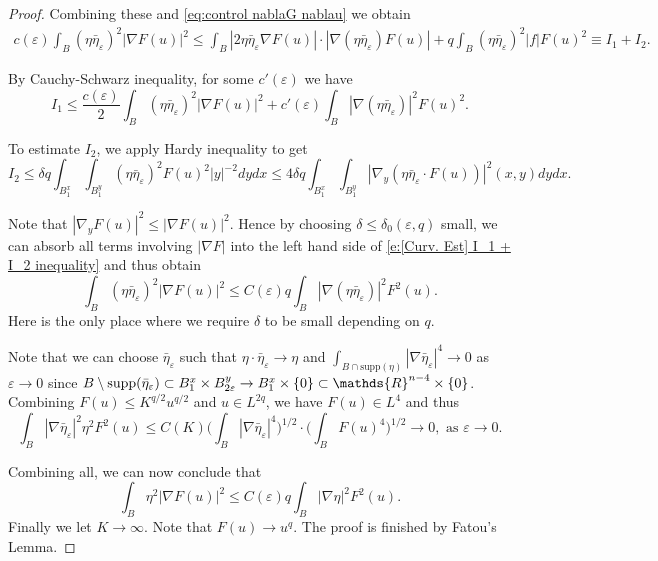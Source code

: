 \documentclass[11pt,reqno]{amsart}
\numberwithin{equation}{section}
\newcommand{\RR}{\mathds{R}}
\newcommand{\supp}{\mathrm{supp }}
\theoremstyle{definition}
\theoremstyle{remark}
\begin{document}
\begin{proof}
Combining these and \eqref{eq:control nablaG nablau} we obtain
\begin{align}\label{e:[Curv. Est] I_1 + I_2 inequality}
    c(\varepsilon) \int_B (\eta \bar{\eta}_{\varepsilon})^2 |\nabla F(u)|^2 \leqslant \int_{B} |2 \eta \bar{\eta}_{\varepsilon} \nabla F(u)| \cdot |\nabla(\eta \bar{\eta}_{\varepsilon}) F(u)|  + q \int_B (\eta \bar{\eta}_{\varepsilon})^2 |f| F(u)^2 \equiv I_1 + I_2.
\end{align}

By Cauchy-Schwarz inequality, for some $c'(\varepsilon)$ we have
\begin{equation}
    I_1 \leqslant \frac{c(\varepsilon)}{2} \int_B (\eta \bar{\eta}_{\varepsilon})^2 |\nabla F(u)|^2 + c'(\varepsilon) \int_B |\nabla (\eta \bar{\eta}_{\varepsilon})|^2 F(u)^2.
\end{equation}

To estimate $I_2$, we apply Hardy inequality to get
\begin{equation}\label{e:[curvatuer bound] I_2}
    I_2 \leqslant  \delta q \int_{B_1^x} \int_{B_1^y} 
    (\eta \bar{\eta}_{\varepsilon})^2 F(u)^2 |y|^{-2} dy dx \leqslant  4\delta q \int_{B_1^x} \int_{B_1^y} |\nabla_y   (\eta \bar{\eta}_{\varepsilon} \cdot F(u))|^2(x,y) dy dx. 
\end{equation}

Note that $|\nabla_y F(u)|^2 \leqslant |\nabla F(u)|^2$. Hence by choosing $\delta \leqslant \delta_0(\varepsilon,q)$ small, we can absorb all terms involving $|\nabla F|$ into the left hand side of \eqref{e:[Curv. Est] I_1 + I_2 inequality} and thus obtain
\begin{equation}
    \int_{B} (\eta \bar{\eta}_{\varepsilon})^2 |\nabla F(u)|^2 \leqslant C(\varepsilon)q \int_B |\nabla (\eta \bar{\eta}_{\varepsilon})|^2 F^2(u).
\end{equation}
Here is the only place where we require $\delta$ to be small depending on $q$. 

Note that we can choose $\bar{\eta}_{\varepsilon}$ such that $\eta \cdot \bar{\eta}_{\varepsilon} \to \eta$ and $\int_{B \cap \supp(\eta)} | \nabla \bar{\eta}_{\varepsilon}|^4 \to 0$ as $\varepsilon \to 0$ since $B\setminus \supp(\Bar{\eta}_{\varepsilon}) \subset B_1^x \times B_{2\varepsilon}^y \to B_1^x \times \{0\} \subset \RR^{n-4} \times \{0\}$. Combining $F(u) \leqslant K^{q/2} u^{q/2}$ and $u \in L^{2q}$, we have $F(u) \in L^4$ and thus
\begin{equation}
    \int_{B} |\nabla \bar{\eta}_{\varepsilon}|^2 \eta^2 F^2(u) \leqslant C(K) \Bigg(\int_{B} |\nabla \bar{\eta}_{\varepsilon}|^4 \Bigg)^{1/2} \cdot \Bigg( \int_B F(u)^4 \Bigg)^{1/2} \to 0, \text{ as } \varepsilon \to 0.
\end{equation}

Combining all, we can now conclude that
\begin{equation}
    \int_{B} \eta^2 |\nabla F(u)|^2 \leqslant C(\varepsilon)q \int_B |\nabla \eta|^2 F^2(u).
\end{equation}
Finally we let $K \to \infty$. Note that $F(u) \to u^{q}$. The proof is finished by Fatou's Lemma.    \end{proof}
\end{document}
